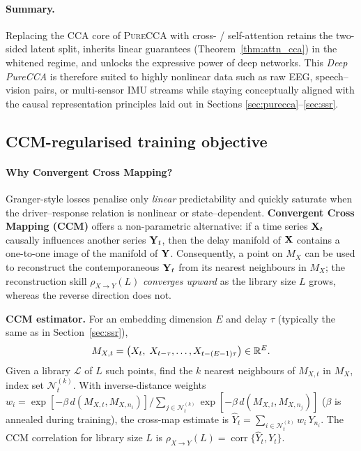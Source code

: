 \documentclass[14pt]{extarticle}
\begin{document}
	\paragraph{Summary.}
	Replacing the CCA core of \textsc{PureCCA} with cross- / self-attention
	retains the two-sided latent split, inherits linear guarantees
	(Theorem~\ref{thm:attn_cca}) in the whitened regime, and unlocks the
	expressive power of deep networks.
	This \emph{Deep PureCCA} is therefore suited to highly nonlinear data
	such as raw EEG, speech–vision pairs, or multi-sensor IMU streams while
	staying conceptually aligned with the causal representation principles
	laid out in Sections \ref{sec:purecca}–\ref{sec:ssr}.
	
	\subsection{CCM-regularised training objective}
	\label{sec:ccm_reg}
	
	\paragraph{Why Convergent Cross Mapping?}
	Granger-style losses penalise only \emph{linear} predictability and
	quickly saturate when the driver–response relation is nonlinear or
	state–dependent.
	\textbf{Convergent Cross Mapping (CCM)} \citep{Sugihara2012} offers a
	non-parametric alternative: if a time series
	$\mathbf{X}_t$ causally influences another series $\mathbf{Y}_t$, then the delay
	manifold of $\mathbf{X}$ contains a one-to-one image of the manifold of $\mathbf{Y}$.
	Consequently, a point on $M_X$ can be used to reconstruct the
	contemporaneous $\mathbf{Y}_t$ from its nearest neighbours in $M_X$;
	the reconstruction skill
	$\rho_{X\to Y}(L)$ \emph{converges upward} as the library size
	$L$ grows, whereas the reverse direction does not.
	
	\vspace{0.2em}
	\noindent\textbf{CCM estimator.}
	For an embedding dimension $E$ and delay $\tau$ (typically the same as
	in Section~\ref{sec:ssr}),
	\[
	M_{X,t}
	=\bigl(X_t,\;X_{t-\tau},\dots,X_{t-(E-1)\tau}\bigr)\in\mathbb{R}^{E}.
	\]
	Given a library $\mathcal L$ of $L$ such points,
	find the $k$ nearest neighbours of $M_{X,t}$ in $M_X$,
	index set $\mathcal N_t^{(k)}$.
	With inverse-distance weights
	$
	w_i=\exp[-\beta\,d(M_{X,t},M_{X,n_i})]\big/\!\!\sum_{j\in\mathcal N_t^{(k)}}\exp[-\beta\,d(M_{X,t},M_{X,n_j})]
	$
	($\beta$ is annealed during training),
	the cross-map estimate is
	$
	\widehat{Y}_t=\sum_{i\in\mathcal N_t^{(k)}}w_i\,Y_{n_i}.
	$
	The CCM correlation for library size $L$ is
	$\rho_{X\to Y}(L)=\operatorname{corr}\!\bigl\{\widehat{Y}_t,Y_t\bigr\}.$
	
\end{document}

